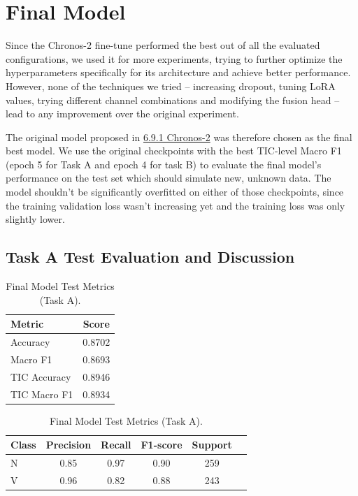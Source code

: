 \section{Final Model}

Since the Chronos-2 fine-tune performed the best out of all the evaluated configurations, we used it for more experiments, trying to further optimize the hyperparameters specifically for its architecture and achieve better performance.
However, none of the techniques we tried -- increasing dropout, tuning LoRA values, trying different channel combinations and modifying the fusion head -- lead to any improvement over the original experiment.

The original model proposed in \hyperref[subsubsec:06-chronos]{6.9.1 Chronos-2} was therefore chosen as the final best model.
We use the original checkpoints with the best TIC-level Macro F1 (epoch 5 for Task A and epoch 4 for task B) to evaluate the final model's performance on the test set which should simulate new, unknown data.
The model shouldn't be significantly overfitted on either of those checkpoints, since the training validation loss wasn't increasing yet and the training loss was only slightly lower.

\subsection{Task A Test Evaluation and Discussion}

\begin{table}[H]
    \centering
    \footnotesize
    \renewcommand{\arraystretch}{1.1}

    \begin{minipage}[t]{0.32\textwidth}
        \centering
        \begin{tabularx}{\textwidth}{X c}
            \toprule
            \textbf{Metric} & \textbf{Score} \tabularnewline
            \midrule
            Accuracy    &  0.8702 \tabularnewline
            Macro F1    & 0.8693 \tabularnewline
            TIC Accuracy & 0.8946 \tabularnewline
            TIC Macro F1 & 0.8934 \tabularnewline
            \bottomrule
        \end{tabularx}
    \end{minipage}
    \hfill
    \begin{minipage}[t]{0.64\textwidth}
        \centering
        \footnotesize
        \begin{tabularx}{\textwidth}{X c c c c c}
            \toprule
            \textbf{Class} & \textbf{Precision} & \textbf{Recall} & \textbf{F1-score} & \textbf{Support} \tabularnewline
            \midrule
            N & 0.85 & 0.97 & 0.90 & 259 \tabularnewline
            V & 0.96 & 0.82 & 0.88 & 243   \tabularnewline
            \bottomrule
        \end{tabularx}
    \end{minipage}

    \caption[Final Model Test Metrics (A)]{Final Model Test Metrics (Task A).}
    \label{tab:06_final_model_test_metrics_A}
\end{table}

